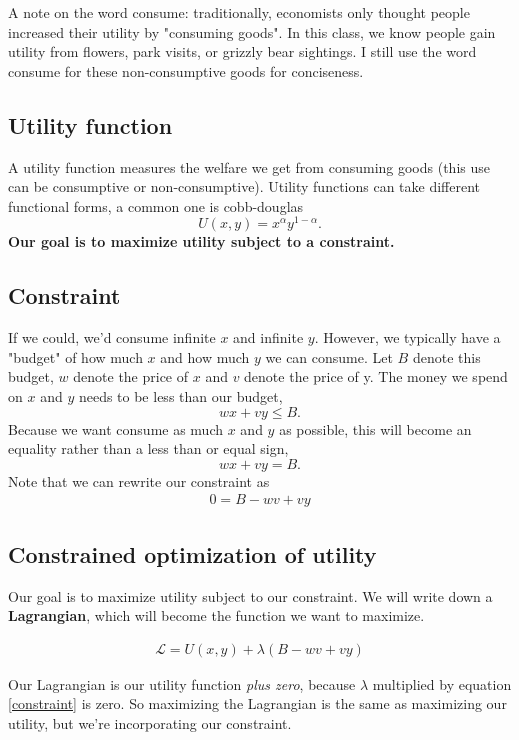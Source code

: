 \documentclass{article}
\begin{document}
A note on the word consume: traditionally, economists only thought people increased their utility by "consuming goods". In this class, we know people gain utility from flowers,  park visits, or grizzly bear sightings. I still use the word consume for these non-consumptive goods for conciseness. 


\subsection{Utility function}
A utility function measures the welfare we get from consuming goods (this use can be consumptive or non-consumptive). Utility functions can take different functional forms, a common one is cobb-douglas 
$$U(x,y) = x^\alpha y^{1-\alpha}.$$
\textbf{Our goal is to maximize utility subject to a constraint. }

\subsection{Constraint}
If we could, we'd consume infinite $x$ and infinite $y$. However, we typically have a "budget" of how much $x$ and how much $y$ we can consume. Let $B$ denote this budget, $w$ denote the price of $x$ and $v$ denote the price of y. The money we spend on $x$ and $y$ needs to be less than our budget,
$$wx + vy \leq B.$$
Because we want consume as much $x$ and $y$ as possible, this will become an equality rather than a less than or equal sign, 
$$wx + vy = B.$$
Note that we can rewrite our constraint as 
\begin{align}
    0 = B - wv + vy
    \label{constraint}
\end{align}

\subsection{Constrained optimization of utility}
Our goal is to maximize utility subject to our constraint. We will write down a \textbf{Lagrangian}, which will become the function we want to maximize. 

\begin{align}
    \mathscr{L} = U(x, y) + \lambda (B - wv + vy)
    \label{lagrange}
\end{align}

Our Lagrangian is our utility function \textit{plus zero}, because $\lambda$ multiplied by equation \ref{constraint} is zero. So maximizing the Lagrangian is the same as maximizing our utility, but we're incorporating our constraint. \\
\end{document}
